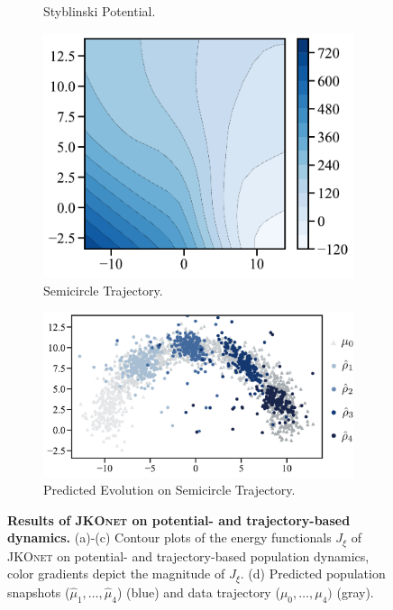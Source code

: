 \begin{figure}[t]
\begin{subfigure}[t]{0.21\textwidth}
         \caption{Styblinski \protect\newline Potential.}
     \end{subfigure}
     \hfill
     \begin{subfigure}[t]{0.22\textwidth}
         \centering
         \includegraphics[width=\textwidth]{figures/fig_energy_implicit_semicircle_tf.pdf}
         \caption{Semicircle \protect\newline Trajectory.}
     \end{subfigure}
     \hfill
     \begin{subfigure}[t]{0.33\textwidth}
         \centering
         \includegraphics[width=\textwidth]{figures/fig_prediction_implicit_semicircle_tf.pdf}
         \caption{Predicted Evolution \protect\newline on Semicircle Trajectory.}
     \end{subfigure}
	 \caption{\textbf{Results of \textsc{JKOnet} on potential- and trajectory-based dynamics.} (a)-(c) Contour plots of the energy functionals $J_\xi$ of \textsc{JKOnet} on potential- and trajectory-based population dynamics, color gradients depict the magnitude of $J_\xi$. (d) Predicted population snapshots ($\hat{\mu}_1, \dots, \hat{\mu}_4$) (blue) and data trajectory ($\mu_0, \dots, \mu_4)$ (gray).}
	 \label{fig:exp_jkonet_pot_traj}
\end{figure}


